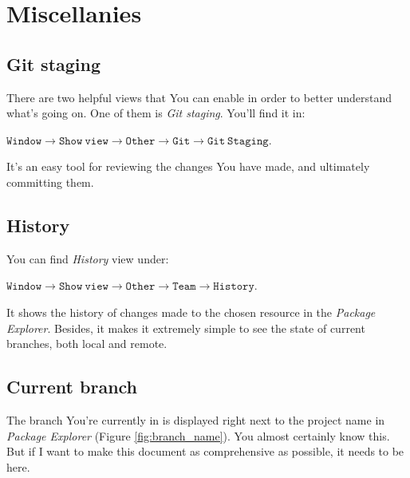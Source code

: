 \documentclass{article}
\begin{document}
\section{Miscellanies}

\subsection{Git staging}
\label{sec:git_staging}

There are two helpful views that You can enable in order to better understand what's going on. One of them is \textit{Git staging}. You'll find it in: \newline

$\mathtt{Window\rightarrow Show\ view \rightarrow Other \rightarrow Git \rightarrow Git\ Staging}$.\newline

It's an easy tool for reviewing the changes You have made, and ultimately committing them.

\subsection{History}
\label{sec:git_history}

You can find \textit{History} view under: \newline

$\mathtt{Window \rightarrow Show\ view \rightarrow Other \rightarrow Team \rightarrow History}$.\newline

It shows the history of changes made to the chosen resource in the \textit{Package Explorer}. Besides, it makes it extremely simple to see the state of current branches, both local and remote.

\subsection{Current branch}

The branch You're currently in is displayed right next to the project name in \textit{Package Explorer} (Figure  \ref{fig:branch_name}). You almost certainly know this. But if I want to make this document as comprehensive as possible, it needs to be here.
\end{document}
